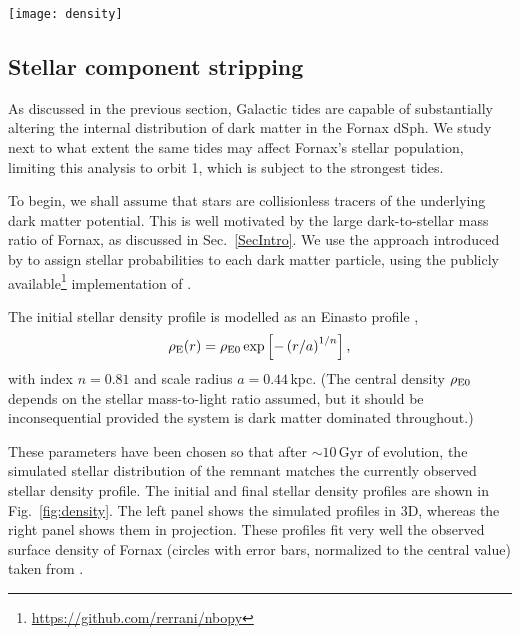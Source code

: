 \documentclass[fleqn,usenatbib]{mnras}
\begin{document}
\begin{figure*}
	\texttt{[image: density]}
    \caption{Left: Dark matter (blue) and stellar (orange) density profiles at infall (dotted curves) and after $\sim 10$ Gyr on orbit 1 (solid curves). 3D half-mass and tidal radii are shown using arrows. Right: Surface brightness (orange curves, normalized to the final central value) profiles obtained from the $N$-body simulations, compared against the observational data by \citet{Coleman2005} (black data points). The projected (2D) half-light radii are shown using arrows. The stellar profile, being deeply embedded in the Fornax dark matter halo, is less affected by tides than the dark matter.}
    \label{fig:density}
\end{figure*}

\subsection{Stellar component stripping}
\label{sec:stars}
As discussed in the previous section, Galactic tides are capable of substantially altering the internal distribution of dark matter in the Fornax dSph. We study next to what extent the same tides may affect Fornax's stellar population, limiting this analysis to orbit 1, which is subject to the strongest tides.

To begin, we shall assume that stars are collisionless tracers of the underlying dark matter potential. This is well motivated by the large dark-to-stellar mass ratio of Fornax, as discussed in Sec.~\ref{SecIntro}.
We use the approach introduced by \citet{Bullock2005} to assign stellar probabilities to each dark matter particle, using the publicly available\footnote{\url{https://github.com/rerrani/nbopy}} implementation of \citet{Errani2020}.

The initial stellar density profile is modelled as an Einasto profile \citep{Einasto1965},
\begin{equation}
    \rho_\mathrm{E}(r)=\rho_{\rm E0} \exp\left[-\left( r/a \right)^{1/n}\right],
	\label{eq:Einasto}
\end{equation}
with index $n=0.81$ and scale radius $a=0.44$\,kpc. (The central density $\rho_{\rm E0}$ depends on the stellar mass-to-light ratio assumed, but it should be inconsequential provided the system is dark matter dominated throughout.)

These parameters have been chosen so that after $\sim 10$\,Gyr of evolution, the simulated stellar distribution of the remnant matches the currently observed stellar density profile. The initial and final stellar density profiles are shown in Fig.~\ref{fig:density}. The left panel shows the simulated profiles in 3D, whereas the right panel shows them in projection. These \citet{Sersic1968} profiles fit very well the observed surface density of Fornax (circles with error bars, normalized to the central value) taken from \citet{Coleman2005}.
\end{document}
